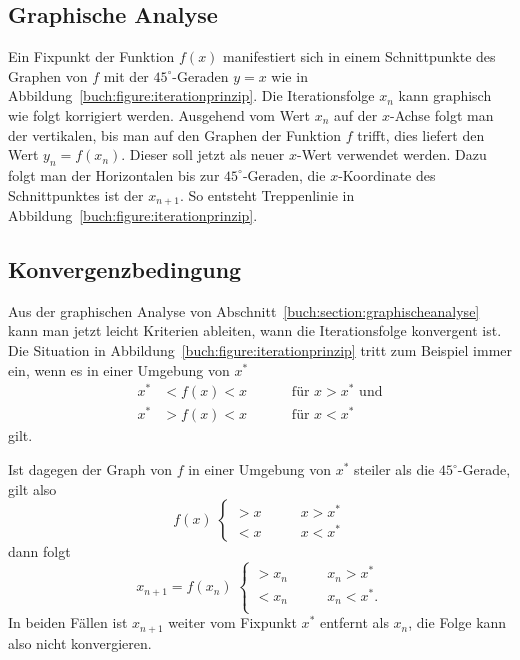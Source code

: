 %
%
\subsection{Graphische Analyse
\label{buch:section:graphischeanalyse}}

Ein Fixpunkt der Funktion $f(x)$ manifestiert sich in einem 
Schnittpunkte des Graphen von $f$ mit der $45^\circ$-Geraden
$y=x$ wie in Abbildung~\ref{buch:figure:iterationprinzip}.
Die Iterationsfolge $x_n$ kann graphisch wie folgt korrigiert
werden.
Ausgehend vom Wert $x_n$ auf der $x$-Achse folgt man der vertikalen,
bis man auf den Graphen der Funktion $f$ trifft, dies liefert den
Wert $y_n=f(x_n)$.
Dieser soll jetzt als neuer $x$-Wert verwendet werden.
Dazu folgt man der Horizontalen bis zur $45^\circ$-Geraden,
die $x$-Koordinate des Schnittpunktes ist der $x_{n+1}$.
So entsteht Treppenlinie in Abbildung~\ref{buch:figure:iterationprinzip}.

%
%
\subsection{Konvergenzbedingung
\label{buch:subsection:konvergenzbedingung}}
Aus der graphischen Analyse von Abschnitt~\ref{buch:section:graphischeanalyse}
kann man jetzt leicht Kriterien ableiten, wann die Iterationsfolge
konvergent ist.
Die Situation in Abbildung~\ref{buch:figure:iterationprinzip}
tritt zum Beispiel immer ein, wenn es in einer Umgebung von $x^*$ 
\[
\begin{aligned}
x^* &< f(x) < x &&& &\text{für $x>x^*$ und} \\
x^* &> f(x) < x &&& &\text{für $x<x^*$}
\end{aligned}
\]
gilt.

Ist dagegen der Graph von $f$ in einer Umgebung von $x^*$ steiler als
die $45^\circ$-Gerade, gilt also
\begin{equation}
f(x) \;\begin{cases}
> x&\qquad x>x^*\\
< x&\qquad x<x^*
\end{cases}
\label{buch:equation:konvergenzbedingung}
\end{equation}
dann folgt
\[
x_{n+1} = f(x_n)
\;
\begin{cases}
> x_n&\qquad x_n>x^*\\
< x_n&\qquad x_n<x^*.\\
\end{cases}
\]
In beiden Fällen ist $x_{n+1}$ weiter vom Fixpunkt $x^*$ entfernt
als $x_n$, die Folge kann also nicht konvergieren.

